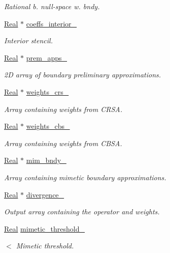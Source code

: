 \begin{DoxyCompactItemize}
\begin{DoxyCompactList}\small\item\em Rational b. null-\/space w. bndy. \end{DoxyCompactList}\item 
\hyperlink{group__c01-roots_gac080bbbf5cbb5502c9f00405f894857d}{Real} $\ast$ \hyperlink{classmtk_1_1Div1D_a7c7688d8ac25120587353ece4e93a13a}{coeffs\+\_\+interior\+\_\+}
\begin{DoxyCompactList}\small\item\em Interior stencil. \end{DoxyCompactList}\item 
\hyperlink{group__c01-roots_gac080bbbf5cbb5502c9f00405f894857d}{Real} $\ast$ \hyperlink{classmtk_1_1Div1D_ab51ff3db86a874604d6c756ab6770950}{prem\+\_\+apps\+\_\+}
\begin{DoxyCompactList}\small\item\em 2\+D array of boundary preliminary approximations. \end{DoxyCompactList}\item 
\hyperlink{group__c01-roots_gac080bbbf5cbb5502c9f00405f894857d}{Real} $\ast$ \hyperlink{classmtk_1_1Div1D_ad36dcfade921f0488fe3edaecc17bd75}{weights\+\_\+crs\+\_\+}
\begin{DoxyCompactList}\small\item\em Array containing weights from C\+R\+S\+A. \end{DoxyCompactList}\item 
\hyperlink{group__c01-roots_gac080bbbf5cbb5502c9f00405f894857d}{Real} $\ast$ \hyperlink{classmtk_1_1Div1D_a631dad42a0ec0f5d5ac767abdfd8949c}{weights\+\_\+cbs\+\_\+}
\begin{DoxyCompactList}\small\item\em Array containing weights from C\+B\+S\+A. \end{DoxyCompactList}\item 
\hyperlink{group__c01-roots_gac080bbbf5cbb5502c9f00405f894857d}{Real} $\ast$ \hyperlink{classmtk_1_1Div1D_a6d6c600117fdb583f061da0c9d5f28f7}{mim\+\_\+bndy\+\_\+}
\begin{DoxyCompactList}\small\item\em Array containing mimetic boundary approximations. \end{DoxyCompactList}\item 
\hyperlink{group__c01-roots_gac080bbbf5cbb5502c9f00405f894857d}{Real} $\ast$ \hyperlink{classmtk_1_1Div1D_a0f96410051ba1fa6d91dfa7b7eacead9}{divergence\+\_\+}
\begin{DoxyCompactList}\small\item\em Output array containing the operator and weights. \end{DoxyCompactList}\item 
\hyperlink{group__c01-roots_gac080bbbf5cbb5502c9f00405f894857d}{Real} \hyperlink{classmtk_1_1Div1D_a40ed629199b38133f5652b71e8b1cd06}{mimetic\+\_\+threshold\+\_\+}
\begin{DoxyCompactList}\small\item\em $<$ Mimetic threshold. \end{DoxyCompactList}\end{DoxyCompactItemize}
